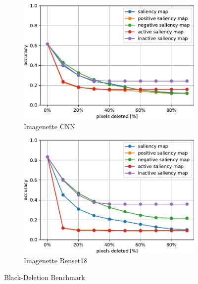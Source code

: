 \documentclass[preprint,12pt]{elsarticle}
\begin{document}
\begin{figure}[h]
\begin{subfigure}{0.49\textwidth}
        \includegraphics[width=\linewidth]{../visualizations/benchmarks/black_deletion/imagenette_cnn.pdf}
        \caption{Imagenette CNN}
    \end{subfigure}
    \hfill
    \begin{subfigure}{0.49\textwidth}
        \centering
        \includegraphics[width=\linewidth]{../visualizations/benchmarks/black_deletion/imagenette_resnet18.pdf}
        \caption{Imagenette Renset18}
    \end{subfigure}
    \caption{Black-Deletion Benchmark}
    \label{fig: black-deletion benchmark}
\end{figure}
\end{document}

